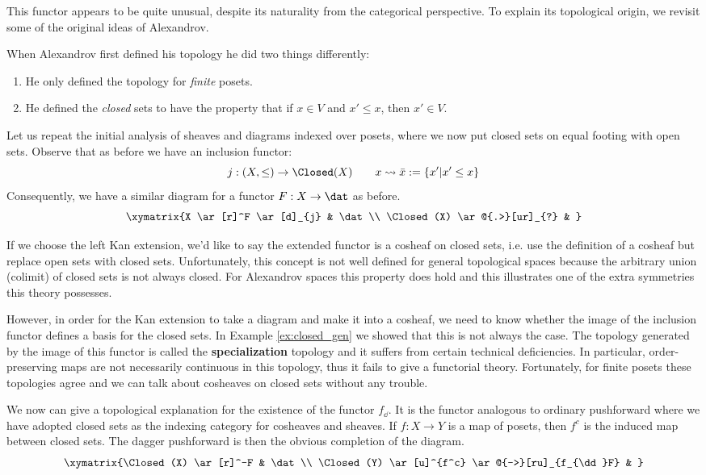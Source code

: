 This functor appears to be quite unusual, despite its naturality from the categorical perspective. To explain its topological origin, we revisit some of the original ideas of Alexandrov.

When Alexandrov first defined his topology he did two things differently:
\begin{enumerate}
	\item He only defined the topology for \emph{finite} posets.
	\item He defined the \emph{closed} sets to have the property that if $x\in V$ and $x'\leq x$, then $x'\in V$.
\end{enumerate}
Let us repeat the initial analysis of sheaves and diagrams indexed over posets, where we now put closed sets on equal footing with open sets. Observe that as before we have an inclusion functor:
\[
 j:(X,\leq) \to \Closed(X) \qquad x \rightsquigarrow \bar{x}:=\{x'| x'\leq x\}
\]
Consequently, we have a similar diagram for a functor $F:X\to\dat$ as before.
\[
	\xymatrix{X \ar[r]^F \ar[d]_{j} & \dat \\
	\Closed(X) \ar@{.>}[ur]_{?} & }
\]

If we choose the left Kan extension, we'd like to say the extended functor is a cosheaf on closed sets, i.e. use the definition of a cosheaf but replace open sets with closed sets. Unfortunately, this concept is not well defined for general topological spaces because the arbitrary union (colimit) of closed sets is not always closed. For Alexandrov spaces this property does hold and this illustrates one of the extra symmetries this theory possesses.

However, in order for the Kan extension to take a diagram and make it into a cosheaf, we need to know whether the image of the inclusion functor defines a basis for the closed sets. In Example \ref{ex:closed_gen} we showed that this is not always the case. The topology generated by the image of this functor is called the \textbf{specialization} topology and it suffers from certain technical deficiencies. In particular, order-preserving maps are not necessarily continuous in this topology, thus it fails to give a functorial theory. Fortunately, for finite posets these topologies agree and we can talk about cosheaves on closed sets without any trouble.

We now can give a topological explanation for the existence of the functor $f_{\dd}$. It is the functor analogous to ordinary pushforward where we have adopted closed sets as the indexing category for cosheaves and sheaves. If $f:X\to Y$ is a map of posets, then $f^c$ is the induced map between closed sets. The dagger pushforward is then the obvious completion of the diagram.
\[
\xymatrix{\Closed(X) \ar[r]^-F & \dat \\
\Closed(Y) \ar[u]^{f^c} \ar@{-->}[ru]_{f_{\dd}F} & }
\]

